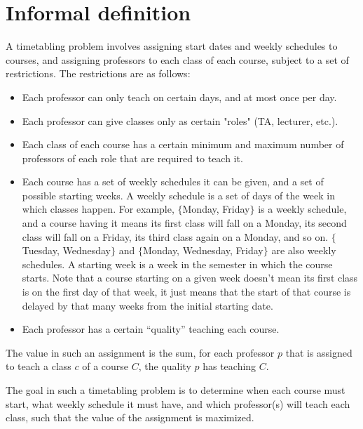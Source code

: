 \section{Informal definition}

A timetabling problem involves assigning start dates and weekly schedules to courses, and assigning professors to each class of each course, subject to a set of restrictions. The restrictions are as follows:

\begin{itemize}
\item Each professor can only teach on certain days, and at most once per day.
\item Each professor can give classes only as certain "roles" (TA, lecturer, etc.).
\item Each class of each course has a certain minimum and maximum number of professors of each role that are required to teach it.
\item Each course has a set of weekly schedules it can be given, and a set of possible starting weeks. A weekly schedule is a set of days of the week in which classes happen. For example, $\{$Monday, Friday$\}$ is a weekly schedule, and a course having it means its first class will fall on a Monday, its second class will fall on a Friday, its third class again on a Monday, and so on. $\{$Tuesday, Wednesday$\}$ and $\{$Monday, Wednesday, Friday$\}$ are also weekly schedules. A starting week is a week in the semester in which the course starts. Note that a course starting on a given week doesn't mean its first class is on the first day of that week, it just means that the start of that course is delayed by that many weeks from the initial starting date.
\item Each professor has a certain ``quality'' teaching each course.
\end{itemize}

The value in such an assignment is the sum, for each professor $p$ that is assigned to teach a class $c$ of a course $C$, the quality $p$ has teaching $C$.

The goal in such a timetabling problem is to determine when each course must start, what weekly schedule it must have, and which professor(s) will teach each class, such that the value of the assignment is maximized.

